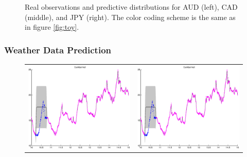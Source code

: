\begin{figure}
\begin{tabular}{ccc}
\end{tabular}
\caption{Real observations and predictive distributions for AUD (left), CAD (middle), and JPY (right). The color coding scheme is the same as in figure \ref{fig:toy}.}
\label{fig:fx}
\end{figure}

\subsubsection{Weather Data Prediction}

\begin{figure}
\centering
\begin{tabular}{cc}
\includegraphics[scale=0.3]{figures/weatherCambermet.eps} &
\includegraphics[scale=0.3]{figures/weatherCambermet.eps} \\

\end{tabular}
\end{figure}
